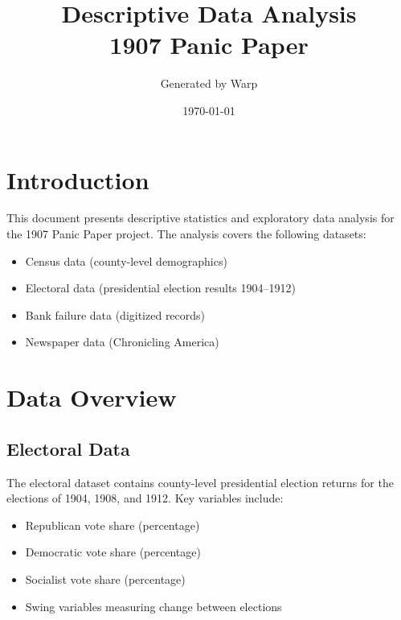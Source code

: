 \documentclass[11pt]{article}
\title{Descriptive Data Analysis\\
\large 1907 Panic Paper}
\author{Generated by Warp}
\date{\today}
\begin{document}
\maketitle

\tableofcontents
\newpage

\section{Introduction}

This document presents descriptive statistics and exploratory data analysis for the 1907 Panic Paper project. The analysis covers the following datasets:

\begin{itemize}
    \item Census data (county-level demographics)
    \item Electoral data (presidential election results 1904--1912)
    \item Bank failure data (digitized records)
    \item Newspaper data (Chronicling America)
\end{itemize}

\section{Data Overview}

\subsection{Electoral Data}

The electoral dataset contains county-level presidential election returns for the elections of 1904, 1908, and 1912. Key variables include:

\begin{itemize}
    \item Republican vote share (percentage)
    \item Democratic vote share (percentage)
    \item Socialist vote share (percentage)
    \item Swing variables measuring change between elections
\end{itemize}
\end{document}
